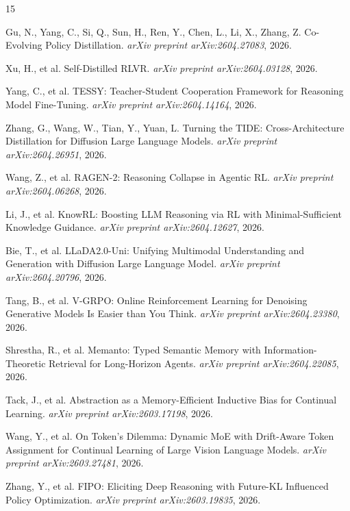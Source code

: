 \documentclass[11pt]{article}
\begin{document}
\begin{thebibliography}{15}

Gu, N., Yang, C., Si, Q., Sun, H., Ren, Y., Chen, L., Li, X., Zhang, Z.
\newblock Co-Evolving Policy Distillation.
\newblock \emph{arXiv preprint arXiv:2604.27083}, 2026.

Xu, H., et al.
\newblock Self-Distilled RLVR.
\newblock \emph{arXiv preprint arXiv:2604.03128}, 2026.

Yang, C., et al.
\newblock TESSY: Teacher-Student Cooperation Framework for Reasoning Model Fine-Tuning.
\newblock \emph{arXiv preprint arXiv:2604.14164}, 2026.

Zhang, G., Wang, W., Tian, Y., Yuan, L.
\newblock Turning the TIDE: Cross-Architecture Distillation for Diffusion Large Language Models.
\newblock \emph{arXiv preprint arXiv:2604.26951}, 2026.

Wang, Z., et al.
\newblock RAGEN-2: Reasoning Collapse in Agentic RL.
\newblock \emph{arXiv preprint arXiv:2604.06268}, 2026.

Li, J., et al.
\newblock KnowRL: Boosting LLM Reasoning via RL with Minimal-Sufficient Knowledge Guidance.
\newblock \emph{arXiv preprint arXiv:2604.12627}, 2026.

Bie, T., et al.
\newblock LLaDA2.0-Uni: Unifying Multimodal Understanding and Generation with Diffusion Large Language Model.
\newblock \emph{arXiv preprint arXiv:2604.20796}, 2026.

Tang, B., et al.
\newblock V-GRPO: Online Reinforcement Learning for Denoising Generative Models Is Easier than You Think.
\newblock \emph{arXiv preprint arXiv:2604.23380}, 2026.

Shrestha, R., et al.
\newblock Memanto: Typed Semantic Memory with Information-Theoretic Retrieval for Long-Horizon Agents.
\newblock \emph{arXiv preprint arXiv:2604.22085}, 2026.

Tack, J., et al.
\newblock Abstraction as a Memory-Efficient Inductive Bias for Continual Learning.
\newblock \emph{arXiv preprint arXiv:2603.17198}, 2026.

Wang, Y., et al.
\newblock On Token's Dilemma: Dynamic MoE with Drift-Aware Token Assignment for Continual Learning of Large Vision Language Models.
\newblock \emph{arXiv preprint arXiv:2603.27481}, 2026.

Zhang, Y., et al.
\newblock FIPO: Eliciting Deep Reasoning with Future-KL Influenced Policy Optimization.
\newblock \emph{arXiv preprint arXiv:2603.19835}, 2026.

\end{thebibliography}
\end{document}
